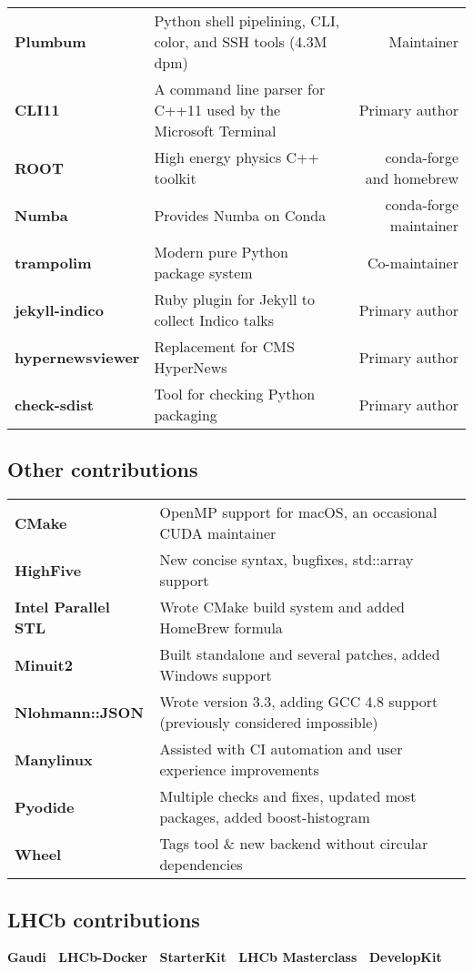 \documentclass[10pt,letterpaper]{moderncv}
\begin{document}
\begin{tabularx}{\textwidth}{>{\bfseries}p{1.2in}Xr}
    Plumbum & Python shell pipelining, CLI, color, and SSH tools (4.3M dpm) & Maintainer \\
	CLI11 & A command line parser for C++11 used by the Microsoft Terminal & Primary author \\
	ROOT & High energy physics C++ toolkit & conda-forge and homebrew \\
	Numba & Provides Numba on Conda & conda-forge maintainer \\
	trampolim & Modern pure Python package system & Co-maintainer \\
    jekyll-indico & Ruby plugin for Jekyll to collect Indico talks & Primary author \\
    hypernewsviewer & Replacement for CMS HyperNews & Primary author \\
    check-sdist & Tool for checking Python packaging & Primary author \\
\end{tabularx}

\subsection{Other contributions}
\begin{tabularx}{\textwidth}{>{\bfseries}p{1.4in}X}
	CMake          & OpenMP support for macOS, an occasional CUDA maintainer  \\
	HighFive       & New concise syntax, bugfixes, std::array support  \\
	Intel Parallel STL & Wrote CMake build system and added HomeBrew formula \\
	Minuit2        & Built standalone and several patches, added Windows support \\
	Nlohmann::JSON & Wrote version 3.3, adding GCC 4.8 support (previously considered impossible) \\
    Manylinux      & Assisted with CI automation and user experience improvements \\
    Pyodide        & Multiple checks and fixes, updated most packages, added boost-histogram \\
    Wheel          & Tags tool \& new backend without circular dependencies \\
\end{tabularx}

\subsection{LHCb contributions}
\textbf{%
	Gaudi \textbullet\
	LHCb-Docker \textbullet\
	StarterKit \textbullet\
	LHCb Masterclass \textbullet\
	DevelopKit
}
\end{document}

